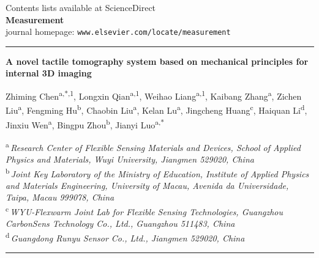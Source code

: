 \documentclass[11pt]{article}
\begin{document}

\noindent
{\footnotesize Contents lists available at ScienceDirect}\\[2pt]
{\Large\bfseries Measurement}\\[2pt]
{\footnotesize journal homepage: \texttt{www.elsevier.com/locate/measurement}}

\vspace{0.8em}
\hrule
\vspace{1em}

{\large\bfseries
A novel tactile tomography system based on mechanical principles
for internal 3D imaging\par}

\vspace{0.8em}

\noindent
Zhiming Chen\textsuperscript{a,*,1},
Longxin Qian\textsuperscript{a,1},
Weihao Liang\textsuperscript{a,1},
Kaibang Zhang\textsuperscript{a},
Zichen Liu\textsuperscript{a},
Fengming Hu\textsuperscript{b},
Chaobin Liu\textsuperscript{a},
Kelan Lu\textsuperscript{a},
Jingcheng Huang\textsuperscript{c},
Haiquan Li\textsuperscript{d},
Jinxiu Wen\textsuperscript{a},
Bingpu Zhou\textsuperscript{b},
Jianyi Luo\textsuperscript{a,*}

\vspace{0.5em}

\noindent
{\footnotesize
\textsuperscript{a}\,\emph{Research Center of Flexible Sensing
Materials and Devices, School of Applied Physics and Materials,
Wuyi University, Jiangmen 529020, China}\\[2pt]
\textsuperscript{b}\,\emph{Joint Key Laboratory of the Ministry of
Education, Institute of Applied Physics and Materials Engineering,
University of Macau, Avenida da Universidade, Taipa, Macau
999078, China}\\[2pt]
\textsuperscript{c}\,\emph{WYU-Flexwarm Joint Lab for Flexible
Sensing Technologies, Guangzhou CarbonSens Technology Co., Ltd.,
Guangzhou 511483, China}\\[2pt]
\textsuperscript{d}\,\emph{Guangdong Runyu Sensor Co., Ltd.,
Jiangmen 529020, China}\par}

\vspace{1em}
\hrule
\vspace{1em}
\end{document}

